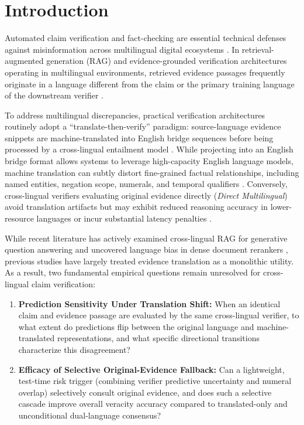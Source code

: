 \section{Introduction}
\label{sec:intro}

Automated claim verification and fact-checking are essential technical defenses against misinformation across multilingual digital ecosystems \citep{thorne-etal-2018-fever,gupta-srikumar-2021-xfact}. In retrieval-augmented generation (RAG) and evidence-grounded verification architectures operating in multilingual environments, retrieved evidence passages frequently originate in a language different from the claim or the primary training language of the downstream verifier \citep{lewis-etal-2020-rag,liu-etal-2025-xrag}.

To address multilingual discrepancies, practical verification architectures routinely adopt a ``translate-then-verify'' paradigm: source-language evidence snippets are machine-translated into English bridge sequences before being processed by a cross-lingual entailment model \citep{ranaldi-etal-2026-multilingual,singhal-etal-2024-comparative}. While projecting into an English bridge format allows systems to leverage high-capacity English language models, machine translation can subtly distort fine-grained factual relationships, including named entities, negation scope, numerals, and temporal qualifiers \citep{singhal-etal-2024-comparative}. Conversely, cross-lingual verifiers evaluating original evidence directly (\emph{Direct Multilingual}) avoid translation artifacts but may exhibit reduced reasoning accuracy in lower-resource languages or incur substantial latency penalties \citep{wang-etal-2026-languages,conneau-etal-2020-unsupervised}.

While recent literature has actively examined cross-lingual RAG for generative question answering \citep{liu-etal-2025-xrag,ranaldi-etal-2026-multilingual} and uncovered language bias in dense document rerankers \citep{wang-etal-2026-languages}, previous studies have largely treated evidence translation as a monolithic utility. As a result, two fundamental empirical questions remain unresolved for cross-lingual claim verification:
\begin{enumerate}
    \item \textbf{Prediction Sensitivity Under Translation Shift:} When an identical claim and evidence passage are evaluated by the same cross-lingual verifier, to what extent do predictions flip between the original language and machine-translated representations, and what specific directional transitions characterize this disagreement?
    \item \textbf{Efficacy of Selective Original-Evidence Fallback:} Can a lightweight, test-time risk trigger (combining verifier predictive uncertainty and numeral overlap) selectively consult original evidence, and does such a selective cascade improve overall veracity accuracy compared to translated-only and unconditional dual-language consensus?
\end{enumerate}

